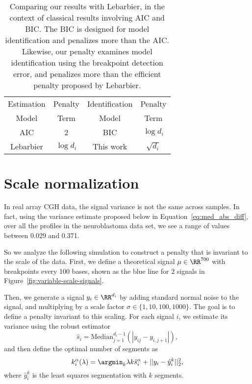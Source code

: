 \documentclass{article}
\begin{document}
\begin{table}[H]
  \centering
  \begin{tabular}{cc|cc}
     Estimation & Penalty & Identification & Penalty \\
     Model & Term & Model & Term\\
     \hline
     AIC & 2 & BIC & $\log d_i$\\
     Lebarbier & $\log d_i$ & This work & $\sqrt{d_i}$\\
  \end{tabular}
  \caption{Comparing our results with Lebarbier, 
in the context of classical results involving AIC and BIC. 
The BIC is designed for model identification and penalizes more than the AIC.
Likewise, our penalty examines model identification using the breakpoint
detection error, and penalizes more than the efficient penalty proposed
by Lebarbier.}
  \label{tab:AIC-BIC}
\end{table}

\newpage

\section{Scale normalization}
\label{variable_scale}
In real array CGH data, the signal variance is not the same across
samples. In fact, using the variance estimate proposed below in
Equation~\ref{eq:med_abs_diff}, over all the profiles in the
neuroblastoma data set, we see a range of values between 0.029 and
0.371.

So we analyze the following simulation to construct a penalty that is
invariant to the scale of the data. First, we define a theoretical
signal $\mu\in\RR^{700}$ with breakpoints every 100 bases, shown as
the blue line for 2 signals in
Figure~\ref{fig:variable-scale-signals}.

Then, we generate a signal $y_i\in\RR^{d_i}$ by adding standard normal
noise to the signal, and multiplying by a scale factor
$\sigma\in\{1,10,100,1000\}$. The goal is to define a penalty
invariant to this scaling.
For each signal $i$, we estimate its
variance using the robust estimator
\begin{equation}
  \label{eq:med_abs_diff}
  \hat s_i = \text{Median}_{j=1}^{d_i-1}
\left(|y_{ij}-y_{i,j+1}|\right),
\end{equation}
and then define the optimal number of segments as
\begin{equation}
  \label{eq:kstar_shat}
  k_i^\alpha(\lambda) = \argmin_k \lambda k \hat s_i^\alpha 
+ ||y_i - \hat y_i^k||^2_2,
\end{equation}
where $\hat y_i^k$ is the least squares segmentation with $k$
segments.
\end{document}
